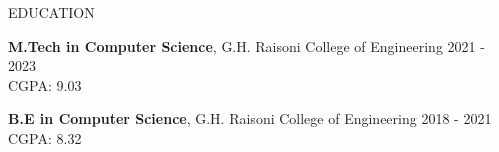 \documentclass{resume} %
\begin{document}
\begin{rSection}{EDUCATION}

{\bf M.Tech in Computer Science}, G.H. Raisoni College of Engineering \hfill {2021 - 2023}\\
CGPA: 9.03

{\bf B.E in Computer Science}, G.H. Raisoni College of Engineering \hfill {2018 - 2021}\\
CGPA: 8.32

\end{rSection}
\end{document}
